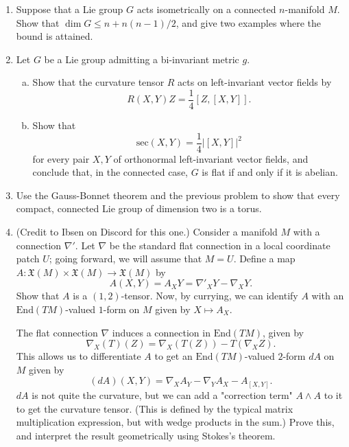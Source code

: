 \documentclass[11pt]{article} %
\begin{document}
\begin{enumerate}
	\item Suppose that a Lie group $G$ acts isometrically on a connected $n$-manifold $M$. Show that $\dim G \leq n + n(n - 1)/2$, and give two examples where the bound is attained.

	\item Let $G$ be a Lie group admitting a bi-invariant metric $g$. 
	\begin{enumerate}[(a)]
		\item Show that the curvature tensor $R$ acts on left-invariant vector fields by 
		\[
			R(X, Y)Z = \frac{1}{4}[Z,[X,Y]].
		\]

		\item Show that 
		\[
			\mathrm{sec}(X, Y) = \frac{1}{4}\left|[X,Y]\right|^2
		\]
		for every pair $X,Y$ of orthonormal left-invariant vector fields, and conclude that, in the connected case, $G$ is flat if and only if it is abelian.
	\end{enumerate}
	
	\item Use the Gauss-Bonnet theorem and the previous problem to show that every compact, connected Lie group of dimension two is a torus.

	\item (Credit to Ibsen on Discord for this one.) Consider a manifold $M$ with a connection $\nabla'$. Let $\nabla$ be the standard flat connection in a local coordinate patch $U$; going forward, we will assume that $M = U$. Define a map $A\colon \mathfrak{X}(M) \times \mathfrak{X}(M) \to \mathfrak{X}(M)$ by 
	\[
		A(X, Y) = A_XY = \nabla'_XY - \nabla_XY.
	\]
	Show that $A$ is a $(1, 2)$-tensor. Now, by currying, we can identify $A$ with an $\mathrm{End}(TM)$-valued $1$-form on $M$ given by $X \mapsto A_X$.

	The flat connection $\nabla$ induces a connection in $\mathrm{End}(TM)$, given by 
	\[
		\nabla_X(T)(Z) = \nabla_X(T(Z)) - T(\nabla_X Z).
	\]
	This allows us to differentiate $A$ to get an $\mathrm{End}(TM)$-valued $2$-form $dA$ on $M$ given by 
	\[
		(dA)(X, Y) = \nabla_X A_Y - \nabla_Y A_X - A_{[X, Y]}.
	\]
	$dA$ is not quite the curvature, but we can add a "correction term" $A \wedge A$ to it to get the curvature tensor. (This is defined by the typical matrix multiplication expression, but with wedge products in the sum.) Prove this, and interpret the result geometrically using Stokes's theorem.


\end{enumerate}
\end{document}
